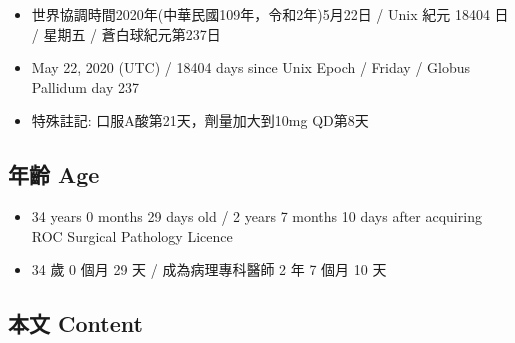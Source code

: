 \documentclass[a5paper, 12pt
]{book}
\providecommand{\tightlist}{%
  \setlength{\itemsep}{0pt}\setlength{\parskip}{0pt}}
\begin{document}
\begin{itemize}
\tightlist
\item
  世界協調時間2020年(中華民國109年，令和2年)5月22日 / Unix 紀元 18404 日
  / 星期五 / 蒼白球紀元第237日
\item
  May 22, 2020 (UTC) / 18404 days since Unix Epoch / Friday / Globus
  Pallidum day 237
\item
  特殊註記: 口服A酸第21天，劑量加大到10mg QD第8天
\end{itemize}

\hypertarget{ux5e74ux9f61-age-82}{%
\subsection{年齡 Age}\label{ux5e74ux9f61-age-82}}

\begin{itemize}
\tightlist
\item
  34 years 0 months 29 days old / 2 years 7 months 10 days after
  acquiring ROC Surgical Pathology Licence
\item
  34 歲 0 個月 29 天 / 成為病理專科醫師 2 年 7 個月 10 天
\end{itemize}

\hypertarget{ux672cux6587-content-82}{%
\subsection{本文 Content}\label{ux672cux6587-content-82}}
\end{document}
